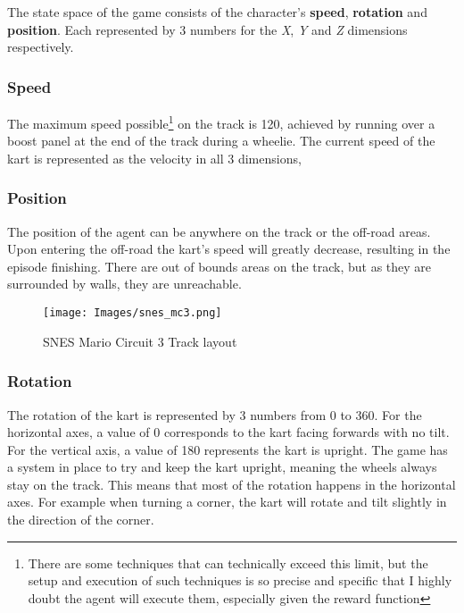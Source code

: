 \documentclass{article}
\begin{document}
The state space of the game consists of the character's \textbf{speed}, \textbf{rotation}  and \textbf{position}. Each represented by 3 numbers for the \textit{X}, \textit{Y} and \textit{Z} dimensions respectively. 
\subsubsection{Speed}
The maximum speed possible\footnote{There are some techniques that can technically exceed this limit, but the setup and execution of such techniques is so precise and specific that I highly doubt the agent will execute them, especially given the reward function} on the track is 120, achieved by running over a boost panel at the end of the track during a wheelie. The current speed of the kart is represented as the velocity in all 3 dimensions, 
\subsubsection{Position}
The position of the agent can be anywhere on the track or the off-road areas. Upon entering the off-road the kart's speed will greatly decrease, resulting in the episode finishing. There are out of bounds areas on the track, but as they are surrounded by walls, they are unreachable. 

\begin{figure}[h]
    \centering
    \texttt{[image: Images/snes\_mc3.png]}
    \caption{SNES Mario Circuit 3 Track layout}
    \label{fig:enter-label}
\end{figure}

\subsubsection{Rotation}
The rotation of the kart is represented by 3 numbers from 0 to 360. For the horizontal axes, a value of 0 corresponds to the kart facing forwards with no tilt. For the vertical axis, a value of 180 represents the kart is upright. The game has a system in place to try and keep the kart upright, meaning the wheels always stay on the track. This means that most of the rotation happens in the horizontal axes. For example when turning a corner, the kart will rotate and tilt slightly in the direction of the corner.
\end{document}
